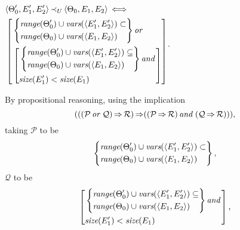 \documentclass[runningheads]{llncs}
\DeclareMathOperator{\uand}{\emph{and}\,}
\DeclareMathOperator{\uor}{\emph{or}\,}
\DeclareMathOperator{\uimplies}{\Rightarrow}
\DeclareMathOperator{\uiff}{\iff}
\begin{document}
 \begin{center}
    $
  \begin{aligned}
    & \begin{aligned}
 &\langle \Thet{0}', \E{1}', \E{2}' \rangle 
 \, \expsub{\prec}{\var{U}} \,
 \langle \Thet{0}, \E{1}, \E{2} \rangle \\
 \end{aligned}  \uiff \\
    &\left[\begin{aligned}
 &\left\{\begin{aligned}
&\range(\Thet{0}')\cup\vars(\langle  \E{1}', \E{2}' \rangle) \subset \\
  &\range(\Thet{0})\cup\vars(\langle \E{1}, \E{2} \rangle) 
  \end{aligned}\right\} \uor \\ 
&\left[\begin{aligned}
 &\left\{\begin{aligned}
 &\range(\Thet{0}')\cup\vars(\langle  \E{1}', \E{2}' \rangle) \subseteq \\
  &\range(\Thet{0})\cup\vars(\langle \E{1}, \E{2} \rangle) 
  \end{aligned}\right\} \uand  \\
  &\size(\E{1}') < \size(\E{1})
  \end{aligned} \right] 
  \end{aligned} \right]
  \end{aligned}
    $.
 \end{center}
By propositional reasoning, using the implication
\[
(
((\mathcal{P} \uor \mathcal{Q}) \uimplies \mathcal{R})
\uimplies
(
(\mathcal{P} \uimplies \mathcal{R})
\uand\,
(\mathcal{Q} \uimplies \mathcal{R})
)
),
\]
taking $\mathcal{P}$ to be \[\left\{\begin{aligned}
&\emph{range}(\Theta_{0}')\cup\emph{vars}(\langle  E_{1}', E_{2}' \rangle) \subset \\
  &\emph{range}(\Theta_{0})\cup\emph{vars}(\langle E_{1}, E_{2} \rangle) 
  \end{aligned}\right\},  \]
  $\mathcal{Q}$ to be
  \[\left[\begin{aligned}
 &\left\{\begin{aligned}
 &\range(\Thet{0}')\cup\vars(\langle  \E{1}', \E{2}' \rangle) \subseteq \\
  &\range(\Thet{0})\cup\vars(\langle \E{1}, \E{2} \rangle) 
  \end{aligned}\right\} \uand  \\
  &\size(\E{1}') < \size(\E{1})
  \end{aligned} \right], \]
\end{document}
